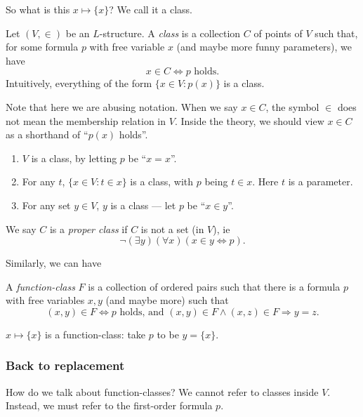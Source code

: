 \documentclass[a4paper]{article}
\begin{document}
So what is this $x\mapsto \{x\}$? We call it a class.
\begin{defi}[Class]
  Let $(V, \in)$ be an $L$-structure. A \emph{class} is a collection $C$ of points of $V$ such that, for some formula $p$ with free variable $x$ (and maybe more funny parameters), we have
  \[
    x\in C\Leftrightarrow p\text{ holds}.
  \]
  Intuitively, everything of the form $\{x\in V: p(x)\}$ is a class.
\end{defi}
Note that here we are abusing notation. When we say $x\in C$, the symbol $\in$ does not mean the membership relation in $V$. Inside the theory, we should view $x\in C$ as a shorthand of ``$p(x)$ holds''.

\begin{eg}\leavevmode
  \begin{enumerate}
    \item $V$ is a class, by letting $p$ be ``$x = x$''.
    \item For any $t$, $\{x\in V: t\in x\}$ is a class, with $p$ being $t\in x$. Here $t$ is a parameter.
    \item For any set $y\in V$, $y$ is a class --- let $p$ be ``$x\in y$''.
  \end{enumerate}
\end{eg}

\begin{defi}
  We say $C$ is a \emph{proper class} if $C$ is not a set (in $V$), ie
  \[
    \neg (\exists y)(\forall x)(x\in y\Leftrightarrow p).
  \]
\end{defi}

Similarly, we can have
\begin{defi}
  A \emph{function-class} $F$ is a collection of ordered pairs such that there is a formula $p$ with free variables $x, y$ (and maybe more) such that
  \[
    (x, y) \in F \Leftrightarrow p\text{ holds, and } (x, y)\in F\wedge (x, z)\in F \Rightarrow y = z.
  \]
\end{defi}

\begin{eg}
  $x\mapsto \{x\}$ is a function-class: take $p$ to be $y = \{x\}$.
\end{eg}

\subsubsection*{Back to replacement}
How do we talk about function-classes? We cannot refer to classes inside $V$. Instead, we must refer to the first-order formula $p$.
\end{document}

